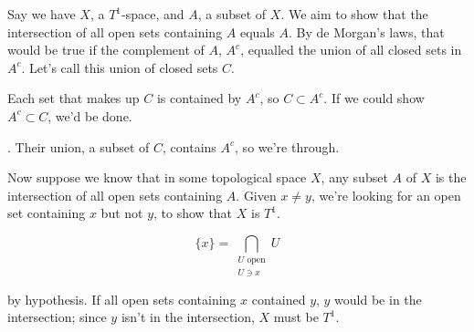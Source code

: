 \documentclass[12pt]{article}
\begin{document}
Say we have $X$, a $T^1$-space, and $A$, a subset of $X$.  We aim to show that the intersection of all open sets containing $A$ equals $A$.  By de Morgan's laws, that would be true if the complement of $A$, $A^c$, equalled the union of all closed sets in $A^c$.  Let's call this union of closed sets $C$.

Each set that makes up $C$ is contained by $A^c$, so $C\subset A^c$.  If we could show $A^c\subset C$, we'd be done.

. Their union, a subset of $C$, contains $A^c$, so we're through.

Now suppose we know that in some topological space $X$, any subset $A$ of $X$ is the intersection of all open sets containing $A$.  Given $x\neq y$, we're looking for an open set containing $x$ but not $y$, to show that $X$ is $T^1$.

\[\{x\}=\bigcap_{\substack{U\text{ open}\\U\ni x}}U\]

by hypothesis.  If all open sets containing $x$ contained $y$, $y$ would be in the intersection; since $y$ isn't in the intersection, $X$ must be $T^1$.
\end{document}
